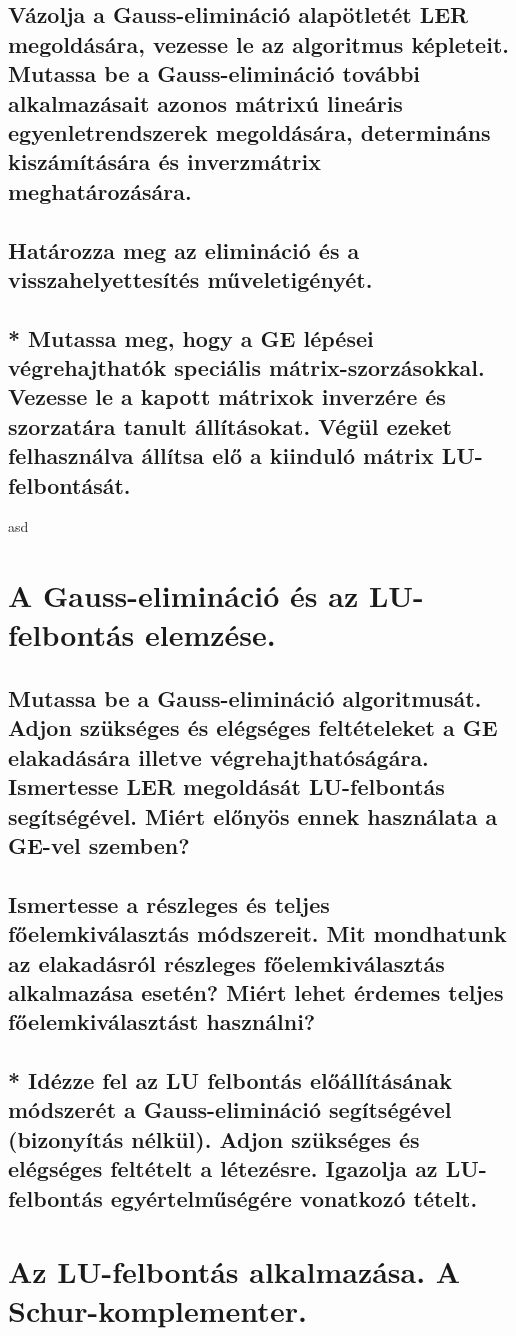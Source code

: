 \documentclass{article}
\begin{document}
        \subsection{Vázolja a Gauss-elimináció alapötletét LER megoldására, vezesse le az algoritmus képleteit. Mutassa be a Gauss-elimináció további alkalmazásait azonos mátrixú lineáris egyenletrendszerek megoldására, determináns kiszámítására és inverzmátrix meghatározására.}
        \subsection{Határozza meg az elimináció és a visszahelyettesítés műveletigényét.}
        \subsection{* Mutassa meg, hogy a GE lépései végrehajthatók speciális mátrix-szorzásokkal. Vezesse le a kapott mátrixok inverzére és szorzatára tanult állításokat. Végül ezeket felhasználva állítsa elő a kiinduló mátrix LU-felbontását.}
asd

    \section{A Gauss-elimináció és az LU-felbontás elemzése.}
        \subsection{Mutassa be a Gauss-elimináció algoritmusát. Adjon szükséges és elégséges feltételeket a GE elakadására illetve végrehajthatóságára. Ismertesse LER megoldását LU-felbontás segítségével. Miért előnyös ennek használata a GE-vel szemben?}
        \subsection{Ismertesse a részleges és teljes főelemkiválasztás módszereit. Mit mondhatunk az elakadásról részleges főelemkiválasztás alkalmazása esetén? Miért lehet érdemes teljes főelemkiválasztást használni?}
        \subsection{* Idézze fel az LU felbontás előállításának módszerét a Gauss-elimináció segítségével (bizonyítás nélkül). Adjon szükséges és elégséges feltételt a létezésre. Igazolja az LU-felbontás egyértelműségére vonatkozó tételt.}


    \section{Az LU-felbontás alkalmazása. A Schur-komplementer.}
\end{document}
